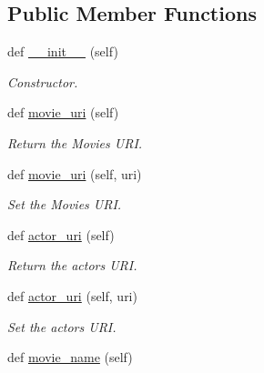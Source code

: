 \subsection*{Public Member Functions}
\begin{DoxyCompactItemize}
\item 
def \hyperlink{classbridges_1_1data__src__dependent_1_1movie__actor__wiki__data_1_1_movie_actor_wiki_data_a9f1d5ab83dd834e7cebfeb195b0c2c80}{\+\_\+\+\_\+init\+\_\+\+\_\+} (self)
\begin{DoxyCompactList}\small\item\em Constructor. \end{DoxyCompactList}\item 
def \hyperlink{classbridges_1_1data__src__dependent_1_1movie__actor__wiki__data_1_1_movie_actor_wiki_data_ae2931df20e7bbd6afead98918c57f8eb}{movie\+\_\+uri} (self)
\begin{DoxyCompactList}\small\item\em Return the Movie\textquotesingle{}s U\+RI. \end{DoxyCompactList}\item 
def \hyperlink{classbridges_1_1data__src__dependent_1_1movie__actor__wiki__data_1_1_movie_actor_wiki_data_ae9e09370897da0ed4daa3a9378907b50}{movie\+\_\+uri} (self, uri)
\begin{DoxyCompactList}\small\item\em Set the Movie\textquotesingle{}s U\+RI. \end{DoxyCompactList}\item 
def \hyperlink{classbridges_1_1data__src__dependent_1_1movie__actor__wiki__data_1_1_movie_actor_wiki_data_a7f0c73452d586c0eb037b4e1c53efcba}{actor\+\_\+uri} (self)
\begin{DoxyCompactList}\small\item\em Return the actor\textquotesingle{}s U\+RI. \end{DoxyCompactList}\item 
def \hyperlink{classbridges_1_1data__src__dependent_1_1movie__actor__wiki__data_1_1_movie_actor_wiki_data_afaf6adac7e472a88852551cc8650b391}{actor\+\_\+uri} (self, uri)
\begin{DoxyCompactList}\small\item\em Set the actor\textquotesingle{}s U\+RI. \end{DoxyCompactList}\item 
def \hyperlink{classbridges_1_1data__src__dependent_1_1movie__actor__wiki__data_1_1_movie_actor_wiki_data_aa76d0a5fb3b3ce8f7209ddf9efabb1cb}{movie\+\_\+name} (self)

\end{DoxyCompactItemize}
